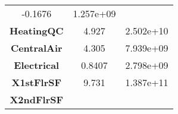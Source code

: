 \documentclass[]{article}
\begin{document}
\begin{longtable}[c]{@{}ccc@{}}
\begin{minipage}[t]{0.16\columnwidth}
-0.1676
\strut\end{minipage} &
\begin{minipage}[t]{0.19\columnwidth}\centering\strut
1.257e+09
\strut\end{minipage}\tabularnewline
\begin{minipage}[t]{0.25\columnwidth}\centering\strut
\textbf{HeatingQC}
\strut\end{minipage} &
\begin{minipage}[t]{0.16\columnwidth}\centering\strut
4.927
\strut\end{minipage} &
\begin{minipage}[t]{0.19\columnwidth}\centering\strut
2.502e+10
\strut\end{minipage}\tabularnewline
\begin{minipage}[t]{0.25\columnwidth}\centering\strut
\textbf{CentralAir}
\strut\end{minipage} &
\begin{minipage}[t]{0.16\columnwidth}\centering\strut
4.305
\strut\end{minipage} &
\begin{minipage}[t]{0.19\columnwidth}\centering\strut
7.939e+09
\strut\end{minipage}\tabularnewline
\begin{minipage}[t]{0.25\columnwidth}\centering\strut
\textbf{Electrical}
\strut\end{minipage} &
\begin{minipage}[t]{0.16\columnwidth}\centering\strut
0.8407
\strut\end{minipage} &
\begin{minipage}[t]{0.19\columnwidth}\centering\strut
2.798e+09
\strut\end{minipage}\tabularnewline
\begin{minipage}[t]{0.25\columnwidth}\centering\strut
\textbf{X1stFlrSF}
\strut\end{minipage} &
\begin{minipage}[t]{0.16\columnwidth}\centering\strut
9.731
\strut\end{minipage} &
\begin{minipage}[t]{0.19\columnwidth}\centering\strut
1.387e+11
\strut\end{minipage}\tabularnewline
\begin{minipage}[t]{0.25\columnwidth}\centering\strut
\textbf{X2ndFlrSF}
\strut\end{minipage} &
\begin{minipage}[t]{0.16\columnwidth}\centering\strut

\end{minipage}
\end{longtable}
\end{document}
